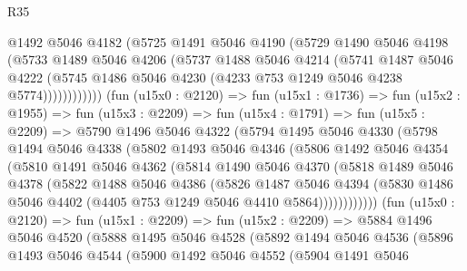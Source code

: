 \begin{lexlean}{R35}
\begin{coremodule}
                  @1492
                  @5046
                  @4182
                  (@5725
                    @1491
                    @5046
                    @4190
                    (@5729
                      @1490
                      @5046
                      @4198
                      (@5733
                        @1489
                        @5046
                        @4206
                        (@5737
                          @1488
                          @5046
                          @4214
                          (@5741
                            @1487
                            @5046
                            @4222
                            (@5745 @1486 @5046 @4230 (@4233 @753 @1249 @5046 @4238 @5774))))))))))))
        (fun (u15x0 : @2120) =>
        fun (u15x1 : @1736) =>
        fun (u15x2 : @1955) =>
        fun (u15x3 : @2209) =>
        fun (u15x4 : @1791) =>
        fun (u15x5 : @2209) =>
        @5790
          @1496
          @5046
          @4322
          (@5794
            @1495
            @5046
            @4330
            (@5798
              @1494
              @5046
              @4338
              (@5802
                @1493
                @5046
                @4346
                (@5806
                  @1492
                  @5046
                  @4354
                  (@5810
                    @1491
                    @5046
                    @4362
                    (@5814
                      @1490
                      @5046
                      @4370
                      (@5818
                        @1489
                        @5046
                        @4378
                        (@5822
                          @1488
                          @5046
                          @4386
                          (@5826
                            @1487
                            @5046
                            @4394
                            (@5830 @1486 @5046 @4402 (@4405 @753 @1249 @5046 @4410 @5864))))))))))))
        (fun (u15x0 : @2120) =>
        fun (u15x1 : @2209) =>
        fun (u15x2 : @2209) =>
        @5884
          @1496
          @5046
          @4520
          (@5888
            @1495
            @5046
            @4528
            (@5892
              @1494
              @5046
              @4536
              (@5896
                @1493
                @5046
                @4544
                (@5900
                  @1492
                  @5046
                  @4552
                  (@5904
                    @1491
                    @5046

\end{coremodule}
\end{lexlean}
